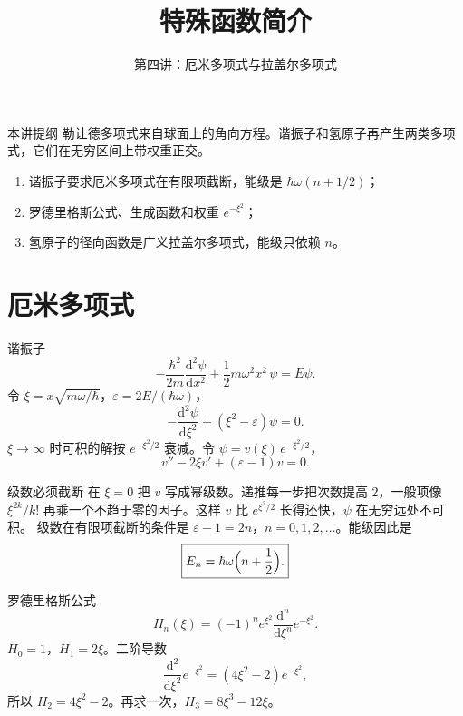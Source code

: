 \documentclass[fontset=windows, chinese, 10pt, xcolor=dvipsnames]{beamer}
\title{特殊函数简介}
\subtitle{第四讲：厄米多项式与拉盖尔多项式}
\begin{document}
\begin{frame}
  \titlepage
\end{frame}

\begin{frame}{本讲提纲}
  勒让德多项式来自球面上的角向方程。谐振子和氢原子再产生两类多项式，它们在无穷区间上带权重正交。
  \begin{enumerate}
    \item 谐振子要求厄米多项式在有限项截断，能级是 $\hbar\omega(n+1/2)$；
    \item 罗德里格斯公式、生成函数和权重 $e^{-\xi^2}$；
    \item 氢原子的径向函数是广义拉盖尔多项式，能级只依赖 $n$。
  \end{enumerate}
\end{frame}

\section{厄米多项式}

\begin{frame}{谐振子}
  \[
    -\frac{\hbar^2}{2m}\frac{\mathrm{d}^2\psi}{\mathrm{d}x^2}
    +\frac12 m\omega^2 x^2\,\psi
    =E\psi.
  \]
  令 $\xi=x\sqrt{m\omega/\hbar}$，$\varepsilon=2E/(\hbar\omega)$，
  \[
    -\frac{\mathrm{d}^2\psi}{\mathrm{d}\xi^2}+(\xi^2-\varepsilon)\psi=0.
  \]
  $\xi\to\infty$ 时可积的解按 $e^{-\xi^2/2}$ 衰减。令 $\psi=v(\xi)\,e^{-\xi^2/2}$，
  \[
    v''-2\xi v'+(\varepsilon-1)v=0.
  \]
\end{frame}

\begin{frame}{级数必须截断}
  在 $\xi=0$ 把 $v$ 写成幂级数。递推每一步把次数提高 $2$，一般项像 $\xi^{2k}/k!$ 再乘一个不趋于零的因子。这样 $v$ 比 $e^{\xi^2/2}$ 长得还快，$\psi$ 在无穷远处不可积。
  \vspace{0.4em}
  级数在有限项截断的条件是 $\varepsilon-1=2n$，$n=0,1,2,\ldots$。能级因此是
  \begin{equation*}
    \boxed{\displaystyle
      E_n=\hbar\omega\Bigl(n+\frac12\Bigr).}
  \end{equation*}
\end{frame}

\begin{frame}{罗德里格斯公式}
  \begin{equation*}
    \boxed{\displaystyle
      H_n(\xi)
      =(-1)^n e^{\xi^2}
        \frac{\mathrm{d}^n}{\mathrm{d}\xi^n}e^{-\xi^2}.}
  \end{equation*}
  $H_0=1$，$H_1=2\xi$。二阶导数
  \[
    \frac{\mathrm{d}^2}{\mathrm{d}\xi^2}e^{-\xi^2}=(4\xi^2-2)e^{-\xi^2},
  \]
  所以 $H_2=4\xi^2-2$。再求一次，$H_3=8\xi^3-12\xi$。
\end{frame}
\end{document}
